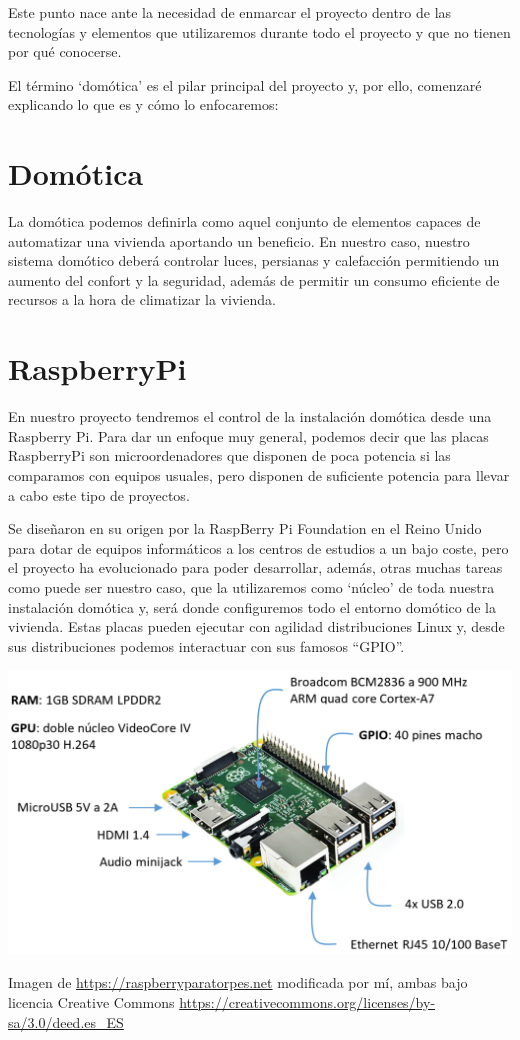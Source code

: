
Este punto nace ante la necesidad de enmarcar el proyecto dentro de las tecnologías y elementos que utilizaremos durante todo el proyecto y que no tienen por qué conocerse.

El término ‘domótica’ es el pilar principal del proyecto y, por ello, comenzaré explicando lo que es y cómo lo enfocaremos:

\section{Domótica}
La domótica podemos definirla como aquel conjunto de elementos capaces de automatizar una vivienda aportando un beneficio.
En nuestro caso, nuestro sistema domótico deberá controlar luces, persianas y calefacción permitiendo un aumento del confort y la seguridad, además de permitir un consumo eficiente de recursos a la hora de climatizar la vivienda.

\section{RaspberryPi}
En nuestro proyecto tendremos el control de la instalación domótica desde una Raspberry Pi. 
Para dar un enfoque muy general, podemos decir que las placas RaspberryPi son microordenadores que disponen de poca potencia si las comparamos con equipos usuales, pero disponen de suficiente potencia para llevar a cabo este tipo de proyectos.

Se diseñaron en su origen por la RaspBerry Pi Foundation en el Reino Unido para dotar de equipos informáticos a los centros de estudios a un bajo coste, pero el proyecto ha evolucionado para poder desarrollar, además, otras muchas tareas como puede ser nuestro caso, que la utilizaremos como ‘núcleo’ de toda nuestra instalación domótica y, será donde configuremos todo el entorno domótico de la vivienda.
Estas placas pueden ejecutar con agilidad distribuciones Linux y, desde sus distribuciones podemos interactuar con sus famosos “GPIO”.
\begin{center}
\includegraphics[width=\textwidth]{img/RBP2B.pdf}
\end{center}
Imagen de \url{https://raspberryparatorpes.net} modificada por mí, ambas bajo licencia Creative Commons \url{https://creativecommons.org/licenses/by-sa/3.0/deed.es_ES}


